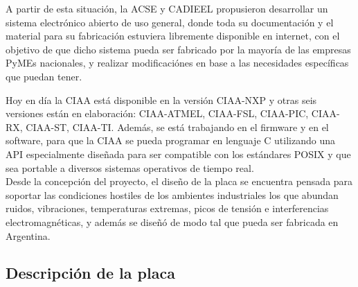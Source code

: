\documentclass[12pt,letterpaper]{article}
\begin{document}
A partir de esta situación, la ACSE y CADIEEL propusieron desarrollar un sistema electrónico abierto de uso general, donde toda su documentación y el material para su fabricación estuviera libremente disponible en internet, con el objetivo de que dicho sistema pueda ser fabricado por la mayoría de las empresas PyMEs nacionales, y realizar modificaciónes en base a las necesidades específicas que puedan tener.




Hoy en día la CIAA está disponible en la versión CIAA-NXP y otras seis versiones están en elaboración: CIAA-ATMEL, CIAA-FSL, CIAA-PIC, CIAA-RX, CIAA-ST, CIAA-TI. Además, se está trabajando en el firmware y en el software, para que la CIAA se pueda programar en lenguaje C utilizando una API especialmente diseñada para ser compatible con los estándares POSIX y que sea portable a diversos sistemas operativos de tiempo real.\\
Desde la concepción del proyecto, el diseño de la placa se encuentra pensada para soportar las condiciones hostiles de los ambientes industriales los que abundan ruidos, vibraciones, temperaturas extremas, picos de tensión e interferencias electromagnéticas, y además se diseñó de modo tal que pueda ser fabricada en Argentina.

\subsection{Descripción de la placa}
\end{document}
